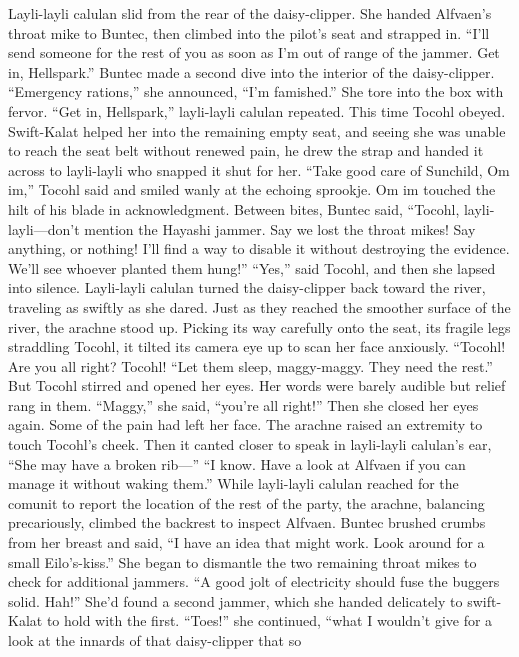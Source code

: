 \documentclass[9pt]{article}
\begin{document}
Layli-layli calulan slid from the rear of the daisy-clipper. She handed Alfvaen’s throat mike to
Buntec, then climbed into the pilot’s seat and strapped in. “I’ll send someone for the rest of you as soon
as I’m out of range of the jammer. Get in, Hellspark.”
Buntec made a second dive into the interior of the daisy-clipper. “Emergency rations,” she
announced, “I’m famished.” She tore into the box with fervor.
“Get in, Hellspark,” layli-layli calulan repeated. This time Tocohl obeyed. Swift-Kalat helped her
into the remaining empty seat, and seeing she was unable to reach the seat belt without renewed pain, he
drew the strap and handed it across to layli-layli who snapped it shut for her.
“Take good care of Sunchild, Om im,” Tocohl said and smiled wanly at the echoing sprookje.
Om im touched the hilt of his blade in acknowledgment.
Between bites, Buntec said, “Tocohl, layli-layli—don’t mention the Hayashi jammer. Say we lost
the throat mikes! Say anything, or nothing! I’ll find a way to disable it without destroying the evidence.
We’ll see whoever planted them hung!”
“Yes,” said Tocohl, and then she lapsed into silence. Layli-layli calulan turned the daisy-clipper
back toward the river, traveling as swiftly as she dared.
Just as they reached the smoother surface of the river, the arachne stood up. Picking its way carefully
onto the seat, its fragile legs straddling Tocohl, it tilted its camera eye up to scan her face anxiously.
“Tocohl! Are you all right? Tocohl!
“Let them sleep, maggy-maggy. They need the rest.”
But Tocohl stirred and opened her eyes. Her words were barely audible but relief rang in them.
“Maggy,” she said, “you’re all right!” Then she closed her eyes again. Some of the pain had left her face.
The arachne raised an extremity to touch Tocohl’s cheek. Then it canted closer to speak in layli-layli
calulan’s ear, “She may have a broken rib—”
“I know. Have a look at Alfvaen if you can manage it without waking them.”
While layli-layli calulan reached for the comunit to report the location of the rest of the party, the
arachne, balancing precariously, climbed the backrest to inspect Alfvaen.
Buntec brushed crumbs from her breast and said, “I have an idea that might work. Look around for a
small Eilo’s-kiss.” She began to dismantle the two remaining throat mikes to check for additional
jammers. “A good jolt of electricity should fuse the buggers solid. Hah!” She’d found a second jammer,
which she handed delicately to swift-Kalat to hold with the first.
“Toes!” she continued, “what I wouldn’t give for a look at the innards of that daisy-clipper that so
\end{document}
